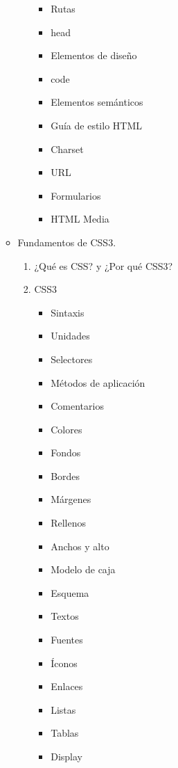 \documentclass[12pt, letterpaper]{article}
\begin{document}
\begin{enumerate}
\begin{itemize}
\begin{enumerate}
\begin{itemize}
                \item Rutas
                \item head
                \item Elementos de diseño
                \item code
                \item Elementos semánticos
                \item Guía de estilo HTML
                \item Charset
                \item URL
                \item Formularios
                \item HTML Media
            \end{itemize}
        \end{enumerate}
        \item Fundamentos de CSS3.
        \begin{enumerate}
            \item ¿Qué es CSS? y ¿Por qué CSS3?
            \item CSS3
            \begin{itemize}
                \item Sintaxis
                \item Unidades
                \item Selectores
                \item Métodos de aplicación
                \item Comentarios
                \item Colores
                \item Fondos
                \item Bordes
                \item Márgenes
                \item Rellenos
                \item Anchos y alto
                \item Modelo de caja
                \item Esquema
                \item Textos
                \item Fuentes
                \item Íconos
                \item Enlaces
                \item Listas
                \item Tablas
                \item Display

\end{itemize}
\end{enumerate}
\end{itemize}
\end{enumerate}
\end{document}
